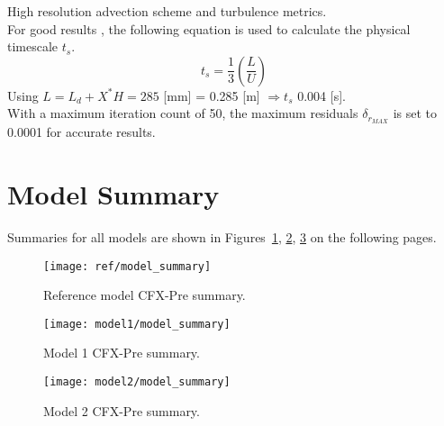 High resolution advection scheme and turbulence metrics.\\

For good results \cite{tut}, the following equation is used to calculate the physical timescale $t_s$. 
\begin{equation}
	\label{eq:ts}
	t_s = \frac{1}{3} \left( \frac{L}{U} \right)
\end{equation}
Using $L = L_d + X^* H = 285$ [mm] = 0.285 [m] $\Rightarrow t_s$ 0.004 [s].\\  

With a maximum iteration count of 50, the maximum residuals $\delta_{r_{MAX}}$ is set to 0.0001 for accurate results.

\section{Model Summary}
\label{sec:pre_summary}

Summaries for all models are shown in Figures~\ref{fig:ref_modsum}, \ref{fig:mod1_modsum},  \ref{fig:mod2_modsum} on the following pages.

\begin{figure}[H]
	\centering
	\texttt{[image: ref/model\_summary]}
	\caption{Reference model CFX-Pre summary.}
	\label{fig:ref_modsum}
\end{figure}
\begin{figure}[H]
	\centering
	\texttt{[image: model1/model\_summary]}
	\caption{Model 1 CFX-Pre summary.}
	\label{fig:mod1_modsum}
\end{figure}
\begin{figure}[H]
	\centering
	\texttt{[image: model2/model\_summary]}
	\caption{Model 2 CFX-Pre summary.}
	\label{fig:mod2_modsum}
\end{figure}